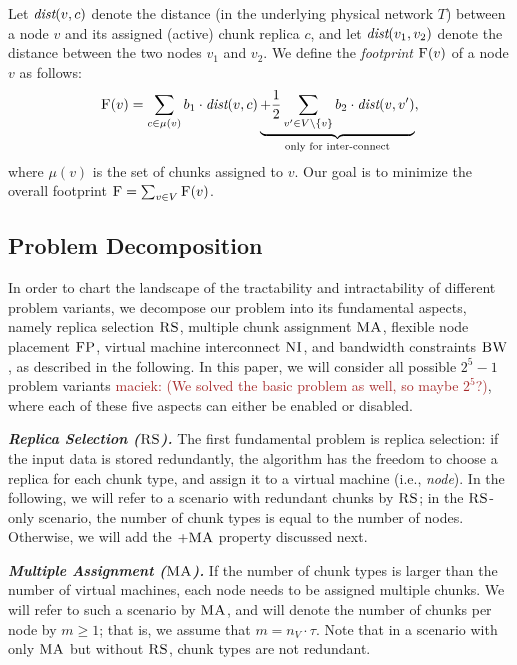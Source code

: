 \documentclass[9pt]{sigcomm-alternate}
\newcommand{\maciek}[1]{\textcolor{brown}{maciek: #1}}
\newcommand{\MaFactor}{m}
\newcommand{\VirtualNodes}{\ensuremath{V}}
\newcommand{\achunk}{\ensuremath{c}}
\newcommand{\dist}{\emph{dist}}
\newcommand{\CC}{\textsc{NI}}
\newcommand{\FP}{\textsc{FP}}
\newcommand{\RS}{\textsc{RS}}
\newcommand{\BW}{\textsc{BW}}
\newcommand{\MA}{\textsc{MA}}
\newcommand{\Cost}{\textsc{F}}
\newcommand{\Tree}{\ensuremath{T}}
\newcommand{\CostTrans}{\ensuremath{b_1}}
\newcommand{\CostCom}{\ensuremath{b_2}}
\begin{document}
Let $\dist(v,\achunk)$ denote the distance (in the underlying physical network $\Tree$) between a node $v$ and
its assigned (active) chunk replica $\achunk$, and let $\dist(v_1,v_2)$ denote the distance between the two nodes $v_1$ and $v_2$.
We define the \emph{footprint} $\Cost(v)$ of a node $v$ as follows:
$$
\Cost(v) = \sum_{\achunk\in \mu(v)} \CostTrans \cdot \dist(v,\achunk) \underbrace{+ \frac{1}{2} \sum_{v' \in \VirtualNodes\setminus\{v\}} \CostCom \cdot \dist(v,v')}_{\text{only for inter-connect}},
$$
\noindent where $\mu(v)$ is the set of chunks assigned to $v$. Our goal is to minimize the overall footprint
$\Cost=\sum_{v\in V} \Cost(v)$.


\subsection{Problem Decomposition}

In order to chart the landscape of the tractability and intractability of different
problem variants, we decompose our problem into its fundamental aspects, namely replica selection
$\RS$, multiple chunk assignment $\MA$, flexible node placement $\FP$, virtual machine interconnect $\CC$,
and bandwidth constraints $\BW$, as described in the following.
In this paper, we will consider all possible $2^5-1$ problem variants \maciek{(We solved the basic problem as well, so maybe $2^5$?)}, where each of these five aspects
can either be enabled or disabled.

\textbf{\emph{Replica Selection ($\RS$).}} The first fundamental problem is replica selection:
if the input data is stored redundantly, the algorithm has the freedom to choose a replica
for each chunk type, and assign it to a virtual machine (i.e., \emph{node}).
In the following, we will refer to a scenario
with redundant chunks by $\RS$; in the $\RS$-only scenario, the number of chunk types
is equal to the number of nodes. Otherwise, we will add the $+\MA$ property discussed next.

\textbf{\emph{Multiple Assignment ($\MA$).}}
If the number of chunk types is larger than the number of virtual machines,
each node needs to be assigned multiple chunks. We will refer to such a scenario by $\MA$,
and will denote the number of chunks per node by $\MaFactor\geq 1$; that is, we assume that
$\MaFactor = n_V\cdot \tau$. 
Note that in a scenario with only $\MA$ but without $\RS$, chunk types are not redundant.
\end{document}
